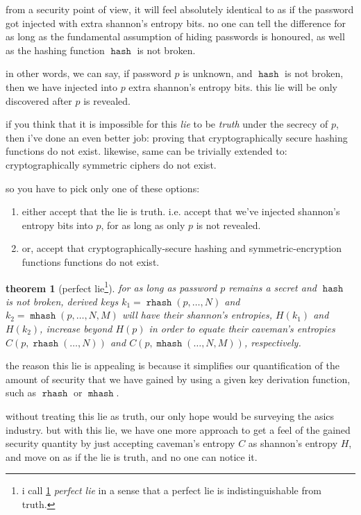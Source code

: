 \documentclass[twocolumn]{article}
\newtheorem{theorem}{theorem}
\DeclareMathOperator{\hash}{\mathtt{hash}}
\DeclareMathOperator{\rhash}{\mathtt{rhash}}
\DeclareMathOperator{\mhash}{\mathtt{mhash}}
\begin{document}
from a security point of view, it will feel absolutely identical to as if
the password got injected with extra shannon's entropy bits.  no one can
tell the difference for as long as the fundamental assumption of hiding
passwords is honoured, as well as the hashing function $\hash$ is not
broken.

in other words, we can say, if password $p$ is unknown, and $\hash$ is not
broken, then we have injected into $p$ extra shannon's entropy bits.  this
lie will be only discovered after $p$ is revealed.

if you think that it is impossible for this \emph{lie} to be \emph{truth}
under the secrecy of $p$, then i've done an even better job: proving that
cryptographically secure hashing functions do not exist.  likewise, same
can be trivially extended to: cryptographically symmetric ciphers do not
exist.

so you have to pick only one of these options:
\begin{enumerate}
    \item either accept that the lie is truth.  i.e. accept that we've
    injected shannon's entropy bits into $p$, for as long as only $p$ is
    not revealed.
    \item or, accept that cryptographically-secure hashing and
    symmetric-encryption functions functions do not exist.
\end{enumerate}

\begin{theorem}
    [perfect lie\footnote{i call \cref{theorem_perfect_lie} \emph{ perfect
    lie} in a sense that a perfect lie is indistinguishable from truth.}]
    \label{theorem_perfect_lie}
    for as long as password $p$ remains a secret and $\hash$ is not broken,
    derived keys $k_1 = \rhash(p, \ldots, N)$ and $k_2 = \mhash(p, \ldots,
    N, M)$ will have their shannon's entropies, $H(k_1)$ and $H(k_2)$,
    increase beyond $H(p)$ in order to equate their caveman's entropies
    $C(p, \rhash(\ldots, N))$ and $C(p, \mhash(\ldots, N, M))$,
    respectively.
\end{theorem}

the reason this lie is appealing is because it simplifies our
quantification of the amount of security that we have gained by using a
given key derivation function, such as $\rhash$ or $\mhash$.

without treating this lie as truth, our only hope would be surveying the
asics industry.  but with this lie, we have one more approach to get a feel
of the gained security quantity by just accepting caveman's entropy $C$ as
shannon's entropy $H$, and move on as if the lie is truth, and no one can
notice it.
\end{document}
